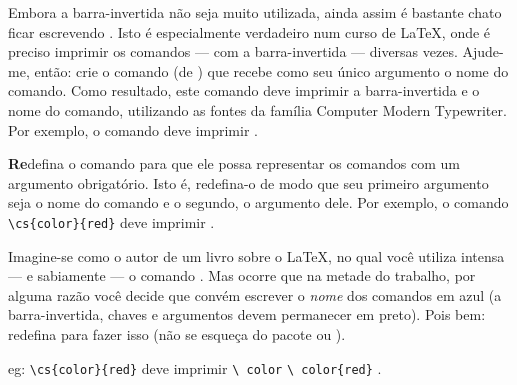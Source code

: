 \documentclass[a4paper,10pt,twocolumn,landscape]{article}
\begin{document}
	\begin{exercicio}
	Embora a barra-invertida não seja muito utilizada, ainda assim é bastante 
	chato ficar escrevendo . Isto é
	especialmente verdadeiro num curso de \LaTeX, onde é preciso imprimir os
	comandos --- com a barra-invertida --- diversas vezes. Ajude-me, então: crie
	o comando  (de ) que recebe como seu único
	argumento o nome do comando. Como resultado, este comando deve imprimir a
	barra-invertida e o nome do comando, utilizando as fontes da família	
	{\ttfamily Computer Modern Typewriter}. Por exemplo, o comando 
	deve imprimir .
	\end{exercicio}
	
	\begin{exercicio}	
	\textbf{Re}defina o comando  para que ele possa representar os 
	comandos
	com um argumento obrigatório. Isto é, redefina-o de modo que seu primeiro 
	argumento seja o nome do comando e o segundo, o argumento dele. Por exemplo,
	o comando \verb|\cs{color}{red}| deve imprimir \cs[red]{color}.
	\end{exercicio}
	
	\begin{exercicio}
	Imagine-se como o autor de um livro sobre o \LaTeX, no qual você utiliza
	intensa --- e sabiamente --- o comando . Mas ocorre que na metade do
	trabalho, por alguma razão você decide que convém escrever o \emph{nome} dos
	comandos em azul (a barra-invertida, chaves e argumentos devem permanecer em
	preto). Pois bem: redefina  para fazer isso (não se esqueça do pacote
	 ou ).
	
	\renewcommand{\cs}[2][\null]{
		\ifthenelse{\equal{#1}{\null}}
		{\texttt{\textbackslash{\color{blue} #2}}}
		{\texttt{\textbackslash{\color{blue} #2}\{#1\}}}
	}
	
	eg: \verb|\cs{color}{red}| deve imprimir .	
	\end{exercicio}
\end{document}
